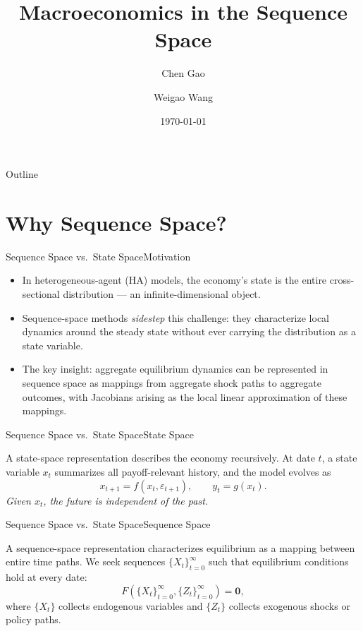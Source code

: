\documentclass[aspectratio=169]{beamer}
\title{Macroeconomics in the Sequence Space}
\author{Chen Gao \and Weigao Wang}
\institute{School of Economics, Peking University}
\date{\today}
\begin{document}
\maketitle

\begin{frame}{Outline}
    \tableofcontents
\end{frame}

\small

\section{Why Sequence Space?}

\begin{frame}{Sequence Space vs.\ State Space}{Motivation}

    \begin{itemize}
        \item In heterogeneous-agent (HA) models, the economy’s state is the \alert{entire cross-sectional distribution} — an infinite-dimensional object.
        \item Sequence-space methods \emph{sidestep} this challenge: they characterize \alert{local dynamics around the steady state} without ever carrying the distribution as a state variable.
        \item The key insight: aggregate equilibrium dynamics can be represented in sequence space as mappings from \alert{aggregate shock paths} to \alert{aggregate outcomes}, with Jacobians arising as the local linear approximation of these mappings.
    \end{itemize}

\end{frame}


\begin{frame}{Sequence Space vs.\ State Space}{State Space}

    \begin{definition}
        A \alert{state-space representation} describes the economy recursively.
        At date $t$, a state variable $x_t$ summarizes all payoff-relevant history, and the model evolves as
        \[
            x_{t+1}=f(x_t,\varepsilon_{t+1}),
            \qquad
            y_t=g(x_t).
        \]
        \emph{Given $x_t$, the future is independent of the past.}
    \end{definition}
\end{frame}

\begin{frame}{Sequence Space vs.\ State Space}{Sequence Space}

    \begin{definition}
        A \alert{sequence-space representation} characterizes equilibrium as a mapping between entire time paths. We seek sequences $\{X_t\}_{t=0}^{\infty}$ such that equilibrium conditions hold at every date:
        \[
            F\!\left(\{X_t\}_{t=0}^{\infty},\{Z_t\}_{t=0}^{\infty}\right)=\bm{0},
        \]
        where $\{X_t\}$ collects endogenous variables and $\{Z_t\}$ collects exogenous shocks or policy paths.
    \end{definition}

\end{frame}
\end{document}
